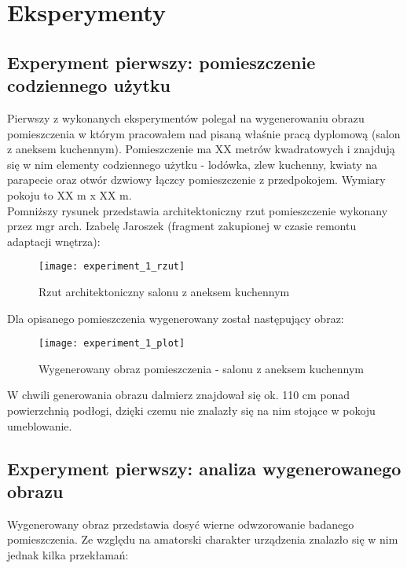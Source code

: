 \section {Eksperymenty}
\subsection {Experyment pierwszy: pomieszczenie codziennego użytku}
Pierwszy z wykonanych eksperymentów polegał na wygenerowaniu obrazu pomieszczenia w którym pracowałem nad pisaną właśnie pracą dyplomową (salon z aneksem kuchennym).
Pomieszczenie ma XX metrów kwadratowych i znajdują się w nim elementy codziennego użytku - lodówka, zlew kuchenny, kwiaty na parapecie oraz otwór dzwiowy łączcy pomieszczenie z przedpokojem. Wymiary pokoju to XX m x XX m.\\

Pomniższy rysunek przedstawia architektoniczny rzut pomieszczenie wykonany przez mgr arch. Izabelę Jaroszek (fragment zakupionej w czasie remontu adaptacji wnętrza):
\begin{figure}[h]
    \centering
    \texttt{[image: experiment\_1\_rzut]}
    \caption{Rzut architektoniczny salonu z aneksem kuchennym}
    \label{fig:experiment_1_rzut}
\end{figure}

Dla opisanego pomieszczenia wygenerowany został następujący obraz:
\begin{figure}[h]
    \centering
    \texttt{[image: experiment\_1\_plot]}
    \caption{Wygenerowany obraz pomieszczenia - salonu z aneksem kuchennym}
    \label{fig:experiment_1_plot}
\end{figure}

W chwili generowania obrazu dalmierz znajdował się ok. 110 cm ponad powierzchnią podłogi, dzięki czemu nie znalazły się na nim stojące w pokoju umeblowanie.

\subsection {Experyment pierwszy: analiza wygenerowanego obrazu}

Wygenerowany obraz przedstawia dosyć wierne odwzorowanie badanego pomieszczenia. Ze względu na amatorski charakter urządzenia znalazło się w nim jednak kilka przekłamań:

